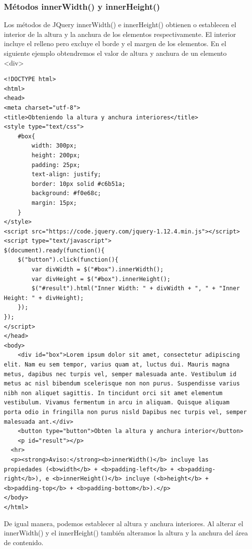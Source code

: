 \documentclass[11pt]{article}
\begin{document}
\subsubsection*{Métodos innerWidth() y innerHeight()}
\label{sec:org1adcebd}

Los métodos de JQuery innerWidth() e innerHeight() obtienen o establecen el interior de la altura y la anchura de los elementos respectivamente. El interior incluye el relleno pero excluye el borde y el margen de los elementos. En el siguiente ejemplo obtendremos el valor de altura y anchura de un elemento <div>

\begin{verbatim}
<!DOCTYPE html>
<html>
<head>
<meta charset="utf-8">
<title>Obteniendo la altura y anchura interiores</title>
<style type="text/css">
    #box{
        width: 300px;
        height: 200px;
        padding: 25px;
        text-align: justify;
        border: 10px solid #c6b51a;
        background: #f0e68c;
        margin: 15px;
    }        
</style>
<script src="https://code.jquery.com/jquery-1.12.4.min.js"></script>
<script type="text/javascript">
$(document).ready(function(){
    $("button").click(function(){
        var divWidth = $("#box").innerWidth();
        var divHeight = $("#box").innerHeight();
        $("#result").html("Inner Width: " + divWidth + ", " + "Inner Height: " + divHeight);
    });
});
</script>
</head>
<body>
    <div id="box">Lorem ipsum dolor sit amet, consectetur adipiscing elit. Nam eu sem tempor, varius quam at, luctus dui. Mauris magna metus, dapibus nec turpis vel, semper malesuada ante. Vestibulum id metus ac nisl bibendum scelerisque non non purus. Suspendisse varius nibh non aliquet sagittis. In tincidunt orci sit amet elementum vestibulum. Vivamus fermentum in arcu in aliquam. Quisque aliquam porta odio in fringilla non purus nisld Dapibus nec turpis vel, semper malesuada ant.</div>
    <button type="button">Obten la altura y anchura interior</button>
    <p id="result"></p>
  <hr>
  <p><strong>Aviso:</strong><b>innerWidth()</b> incluye las propiedades (<b>width</b> + <b>padding-left</b> + <b>padding-right</b>), e <b>innerHeight()</b> incluye (<b>height</b> + <b>padding-top</b> + <b>padding-bottom</b>).</p>
</body>
</html>                                		
\end{verbatim}

De igual manera, podemos establecer al altura y anchura interiores. Al alterar el innerWidth() y el innerHeight() también alteramos la altura y la anchura del área de contenido.
\end{document}
